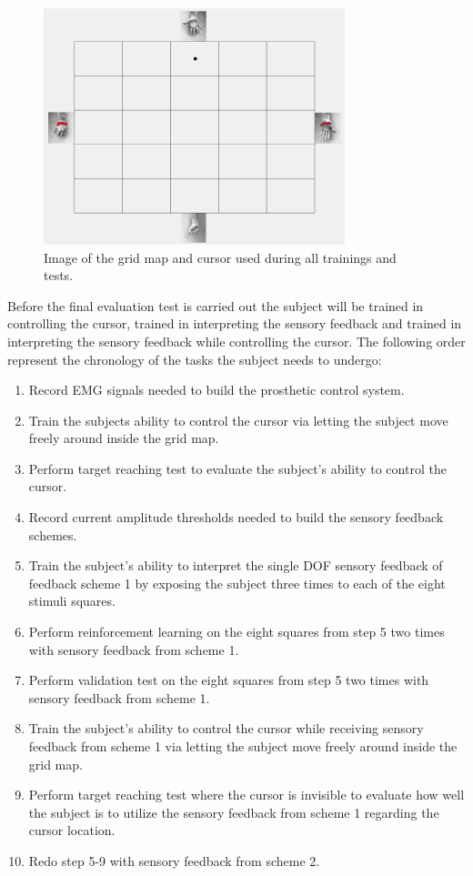 \begin{figure}[H]                 
	\includegraphics[width=0.78\textwidth]{figures/gridmap}  
	\caption{Image of the grid map and cursor used during all trainings and tests.}
	\label{fig:gridmap} 
\end{figure}

Before the final evaluation test is carried out the subject will be trained in controlling the cursor, trained in interpreting the sensory feedback and trained in interpreting the sensory feedback while controlling the cursor. The following order represent the chronology of the tasks the subject needs to undergo:

\begin{enumerate}
	\item Record EMG signals needed to build the prosthetic control system.
	\item Train the subjects ability to control the cursor via letting the subject move freely around inside the grid map.
	\item Perform target reaching test to evaluate the subject's ability to control the cursor.
	\item Record current amplitude thresholds needed to build the sensory feedback schemes.
	\item Train the subject's ability to interpret the single DOF sensory feedback of feedback scheme 1 by exposing the subject three times to each of the eight stimuli squares.
	\item Perform reinforcement learning on the eight squares from step 5 two times with sensory feedback from scheme 1.
	\item Perform validation test on the eight squares from step 5 two times with sensory feedback from scheme 1.
	\item Train the subject's ability to control the cursor while receiving sensory feedback from scheme 1 via letting the subject move freely around inside the grid map.
	\item Perform target reaching test where the cursor is invisible to evaluate how well the subject is to utilize the sensory feedback from scheme 1 regarding the cursor location.
	\item Redo step 5-9 with sensory feedback from scheme 2.
\end{enumerate}


